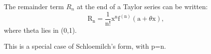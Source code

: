 The remainder term $R_{n}$  at the end of a Taylor series can
be written:
\[ \mathrm{R}_{\mathrm{n}} = \frac{1}{\mathrm{n}!}
\mathrm{x}^{\mathrm{n}} \mathrm{f}^{( \mathrm{n} ) } 
( \mathrm{a} + \theta \mathrm{x} ) , \]
where theta lies in (0,1).
\par
This is a special case of Schloemilch's form, with p=n.